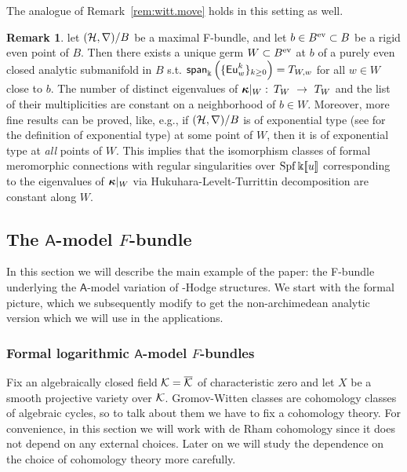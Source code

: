 \documentclass[twoside,leqno]{article}
\numberwithin{equation}{section}
\theoremstyle{plain}
\theoremstyle{definition}
\newtheorem{remark}[equation]{Remark}
\begin{document}
\noindent
The analogue of Remark~\ref{rem:witt.move} holds in this setting as well. 

\begin{remark} \label{rem:Fbundle.witt.move}
let $(\mathcal H,\nabla)/B$ be a maximal F-bundle, and let $b \in B^{\mathrm{ev}} \subset B$ be a rigid even point  of $B$. Then there exists a unique germ $W \subset B^{\mathrm{ev}}$ at $b$ of a purely even closed analytic submanifold in $B$ s.t. 
$\mathsf{span}_{\Bbbk}\left(\{\operatorname{\mathsf{Eu}}^{k}_{w}\}_{k\geq 0}\right) = T_{W,w}$ for all $w\in W$ close to $b$. 
The number of distinct eigenvalues of $\bkappa|_{W} \, \colon \, T_{W} \ \to \ T_{W}$ and the list of their multiplicities are constant on a neighborhood of $b \in W$. Moreover, more fine results can be proved, like, e.g., if $(\mathcal H,\nabla)/B$ is of exponential type (see \cite{Katzarkov_Hodge_theoretic_aspects} for the definition of exponential type) at some point of $W$, then it is of exponential type at \textit{all}  points of $W$. This implies that the isomorphism classes of formal meromorphic connections with regular singularities over $\operatorname{Spf}\Bbbk[\![u]\!]$ corresponding to the eigenvalues of $\boldsymbol{\kappa}|_{W}$ via Hukuhara-Levelt-Turrittin decomposition are constant along $W$.
\end{remark}

\subsection{The \texorpdfstring{$\mathsf{A}$}{A}-model \texorpdfstring{$F$}{F}-bundle} \label{subsec:Amodelexample}

In this section we will describe the main example of the paper: the F-bundle underlying the $\mathsf{A}$-model variation of \nc-Hodge structures.  We start with the formal picture, which we subsequently modify to get the non-archimedean analytic version which we will use in the applications.

\subsubsection{Formal logarithmic  \texorpdfstring{$\mathsf{A}$}{A}-model 
\texorpdfstring{$F$}{F}-bundles} \label{sssec:Amodelformal}

Fix an algebraically closed  field $\mathcal K = \overline{\mathcal K}$ of characteristic zero and let $X$ be a smooth projective variety over $\mathcal K$. Gromov-Witten classes are cohomology classes of algebraic cycles, so to talk about them we have to fix a cohomology theory. For convenience, in this section we will work with de Rham cohomology since it does not depend on any external choices. Later on we will study the dependence on the choice of cohomology theory more carefully.
\end{document}
